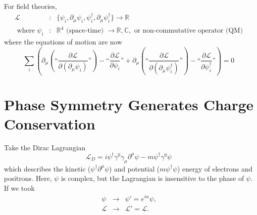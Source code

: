 \documentclass[12pt]{article}
\begin{document}
For field theories,
\begin{eqnarray}
  \mathcal{L} &:& \{\psi_i, \partial_\mu \psi_i, \psi_i^\dagger, \partial_\mu \psi_i^\dagger\} \to \mathbb{R} \\
  \mbox{ where } \psi_i &:& \mathbb{R}^4 \mbox{ (space-time) } \to \mathbb{R}, \mathbb{C}, \mbox{ or non-commutative operator (QM)}
\end{eqnarray}
where the equations of motion are now
\begin{equation}
  \sum_i \left( \partial_\mu \left(\mbox{``}\frac{\partial \mathcal{L}}{\partial (\partial_\mu \psi_i)} \mbox{''}
  \right) - \mbox{``} \frac{\partial \mathcal{L}}{\partial \psi_i} \mbox{''} +
  \partial_\mu \left(\mbox{``} \frac{\partial \mathcal{L}}{\partial (\partial_\mu \psi_i^\dagger)} \mbox{''}
  \right) - \mbox{``} \frac{\partial \mathcal{L}}{\partial \psi_i^\dagger} \mbox{''} \right) = 0
\end{equation}

\section{Phase Symmetry Generates Charge Conservation}

Take the Dirac Lagrangian
\begin{equation}
  \mathcal{L}_D = i \psi^\dagger \gamma^0 \gamma_\mu \partial^\mu \psi - m \psi^\dagger \gamma^0 \psi
\end{equation}
which describes the kinetic ($\psi^\dagger \partial^\mu \psi$) and
potential ($m \psi^\dagger \psi$) energy of electrons and positrons.
Here, $\psi$ is complex, but the Lagrangian is insensitive to the
phase of $\psi$.  If we took
\begin{eqnarray}
  \psi &\to& \psi' = e^{i \alpha} \psi \mbox{,} \label{globalphase} \\
  \mathcal{L} &\to& \mathcal{L}' = \mathcal{L} \mbox{.}
\end{eqnarray}
\end{document}
